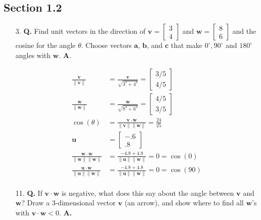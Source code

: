\documentclass[main.tex]{subfiles}
\begin{document}
\subsection{Section 1.2}

    \begin{enumerate}
        \item [3.] \textbf{Q.} Find unit vectors in the direction of $ \bm{v} = \left[\begin{array}{l} 3 \\ 4\end{array}\right]$ and $\bm{w} = \left[\begin{array}{l}8 \\ 6\end{array}\right]$ and the cosine for the angle $\theta$. Choose vectors $\bm{a}$, $\bm{b}$, and $\bm{c}$ that make $0^{\circ}, 90^{\circ}$ and $180^{\circ}$ angles with $\bm{w}$. \textbf{A}.
        
        $$
        \begin{aligned}
            \frac{\bm{v}}{\|\bm{v}\|} & = \frac{\bm{v}}{\sqrt{3^2 + 4^2}} = \left[\begin{array}{l} 3/5 \\ 4/5 \end{array}\right]\\
            \frac{\bm{w}}{\|\bm{w}\|} & = \frac{\bm{w}}{\sqrt{8^2 + 6^2}} = \left[\begin{array}{l} 4/5 \\ 3/5 \end{array}\right]\\
            \cos(\theta) & = \frac{\bm{v}\cdot\bm{w}}{\|\bm{v}\|\|\bm{w}\|} 
            = \frac{24}{25}\\
            \bm{u} & = \left[\begin{array}{l} -.6 \\ .8\end{array}\right] \\
            \frac{\bm{w}\cdot\bm{w}}{\|\bm{w}\|\|\bm{w}\|} & = \frac{-4.8 + 4.8}{\|\bm{u}\|\|\bm{w}\|} = 0 = \cos(0)\\
            \frac{\bm{u}\cdot\bm{w}}{\|\bm{u}\|\|\bm{w}\|} & = \frac{-4.8 + 4.8}{\|\bm{u}\|\|\bm{w}\|} = 0 = \cos(90)\\
        \end{aligned}
        $$
        
        \item [11.] \textbf{Q.} If $\bm{v} \cdot \bm{w}$ is negative, what does this say about the angle between $\bm{v}$ and $\bm{w}$? Draw a 3-dimensional vector $\bm{v}$ (an arrow), and show where to find all $\bm{w}$'s with $\bm{v} \cdot \bm{w} < 0$. \textbf{A.}
        

\end{enumerate}
\end{document}
